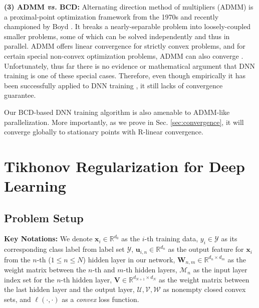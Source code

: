 \documentclass{article}
\def\vs{\emph{vs. }}
\begin{document}
	{\bf (3) ADMM \vs BCD:}
	Alternating direction method of multipliers (ADMM) is a proximal-point optimization framework from the 1970s and recently championed by Boyd \cite{boyd2011distributed}. It breaks a nearly-separable problem into loosely-coupled smaller problems, some of which can be solved independently and thus in parallel. ADMM offers linear convergence for strictly convex problems, and for certain special non-convex optimization problems, ADMM can also converge \cite{nishihara2015general,wang2015global}. %
Unfortunately, thus far there is no evidence or mathematical argument that DNN training is one of these special cases. Therefore, even though empirically it has been successfully applied to DNN training \cite{taylor2016training,Zhang_2016_CVPR}, it still lacks of convergence guarantee. %

	Our BCD-based DNN training algorithm is also amenable to ADMM-like parallelization.  More importantly, as we prove in Sec. \ref{sec:convergence}, it will converge globally to stationary points with R-linear convergence.
    
\section{Tikhonov Regularization for Deep Learning}

\subsection{Problem Setup}	
    	 
    {\bf Key Notations:} We denote $\mathbf{x}_i\in\mathbb{R}^{d_0}$ as the $i$-th training data, $y_i\in\mathcal{Y}$ as its corresponding class label from label set $\mathcal{Y}$, $\mathbf{u}_{i,n}\in\mathbb{R}^{d_n}$ as the output feature for $\mathbf{x}_i$ from the $n$-th ($1\leq n\leq N$) hidden layer in our network, $\mathbf{W}_{n,m}\in\mathbb{R}^{d_n\times d_m}$ as the weight matrix between the $n$-th and $m$-th hidden layers, $\mathcal{M}_n$ as the input layer index set for the $n$-th hidden layer, $\mathbf{V}\in\mathbb{R}^{d_{N+1}\times d_N}$ as the weight matrix between the last hidden layer and the output layer, $\mathcal{U}, \mathcal{V}, \mathcal{W}$ as nonempty closed convex sets, and $\ell(\cdot,\cdot)$ as a {\em convex} loss function.      
    	        
\end{document}
